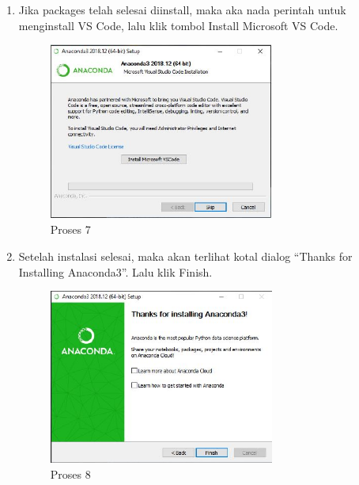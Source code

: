 \begin{itemize}
\begin{enumerate}
\item Jika packages telah selesai diinstall, maka aka nada perintah untuk menginstall VS Code, lalu klik tombol Install Microsoft VS Code.
\begin{figure}[ht]
	\centerline{\includegraphics[width=0.70\textwidth]{figures/1/1154121/g.JPG}}
	\caption{Proses 7}
	\label{gambar7 }
\end{figure}

\item Setelah instalasi selesai, maka akan terlihat kotal dialog “Thanks for Installing Anaconda3”. Lalu klik Finish.
\begin{figure}[ht]
	\centerline{\includegraphics[width=0.70\textwidth]{figures/1/1154121/h.JPG}}
	\caption{Proses 8}
	\label{gambar8 }
\end{figure}
	    \end{enumerate}
\end{itemize} 
